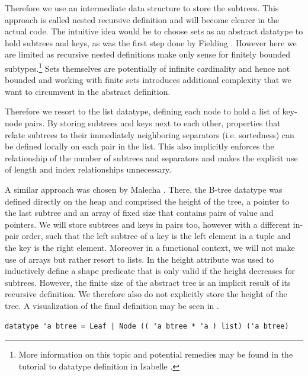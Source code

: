 Therefore we use an intermediate data structure to store the subtrees.
This approach is called nested recursive definition
and will become clearer in the actual code.
The intuitive idea would be to choose sets as an abstract
datatype to hold subtrees and keys, as was the first step done by Fielding \parencite{Fielding80}.
However here we are limited as recursive nested definitions
make only sense for finitely bounded subtypes.\footnote{
    More information on this topic and potential remedies
    may be found in the tutorial to datatype definition in Isabelle
    \parencite{isabelleDatatypeManual}.
}
Sets themselves are potentially of infinite cardinality
and hence not bounded and working with finite sets
introduces additional complexity that we want
to circumvent in the abstract definition.

Therefore we resort to the list datatype,
defining each node to hold a list of key-node pairs.
By storing subtrees and keys next to each other,
properties that relate subtrees to their immediately
neighboring separators (i.e. sortedness)
can be defined locally on each pair in the list.
This also implicitly enforces the relationship of the number of subtrees
and separators and makes the explicit use of length and index relationships unnecessary.

A similar approach was chosen by Malecha \parencite{DBLP:conf/popl/MalechaMSW10}.
There, the B-tree datatype was defined directly on the heap
and comprised the height of the tree, a pointer to the last subtree and
an array of fixed size that contains pairs of value and pointers.
We will store subtrees and keys in pairs too,
however with a different in-pair order,
such that the left subtree of a key is the left element
in a tuple and the key is the right element.
Moreover in a functional context, we will not make use of arrays
but rather resort to lists.
In \parencite{DBLP:conf/popl/MalechaMSW10} the height attribute was
used to inductively define a shape predicate that is only valid
if the height decreases for subtrees.
However, the finite size of the abstract tree is an implicit
result of its recursive definition.
We therefore also do not explicitly store the height of the tree.
A visualization of the final definition may be seen in .

\begin{lstlisting}[mathescape=true, language=Isabelle,label=lst:btree-def]
datatype 'a btree = Leaf | Node (( 'a btree * 'a ) list) ('a btree)
\end{lstlisting}

